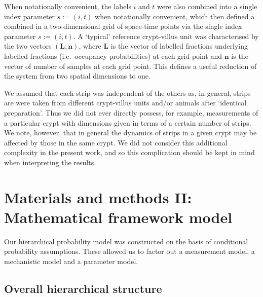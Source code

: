 \documentclass[10pt,letterpaper]{article}
\providecommand{\DIFaddtex}[1]{{\protect\color{blue} \sf #1}} %
\providecommand{\DIFdeltex}[1]{{\protect\color{red} \scriptsize #1}} %
\providecommand{\DIFaddbegin}{} %
\providecommand{\DIFaddend}{} %
\providecommand{\DIFdelbegin}{} %
\providecommand{\DIFdelend}{} %
\providecommand{\DIFadd}[1]{\texorpdfstring{\DIFaddtex{#1}}{#1}} %
\providecommand{\DIFdel}[1]{\texorpdfstring{\DIFdeltex{#1}}{}} %
\begin{document}
\DIFadd{When notationally convenient, the }\DIFaddend labels \(i\) and \(t\) were \DIFdelbegin \DIFdel{also combined
into a single index parameter \(s := (i,t)\) when notationally
convenient, which then defined a }\DIFdelend \DIFaddbegin \DIFadd{combined
in a }\DIFaddend two-dimensional grid of space-time points \DIFaddbegin \DIFadd{via the single index
parameter \(s := (i,t)\)}\DIFaddend . A `typical' reference crypt-villus unit was
characterised by the two vectors \((\mathbf{L},\mathbf{n})\), where
\(\mathbf{L}\) is the vector of \DIFdelbegin \DIFdel{labelled fractions }\DIFdelend \DIFaddbegin \DIFadd{underlying labelled fractions
(i.e.~occupancy probabilities) }\DIFaddend at each grid point and \(\mathbf{n}\) is
the vector of number of samples at each grid point. This defines a
useful reduction of the system from two spatial dimensions to one.

We assumed that each strip was independent of the others as, in general,
strips \DIFdelbegin \DIFdel{are }\DIFdelend \DIFaddbegin \DIFadd{were }\DIFaddend taken from different crypt-villus units and/or animals after
`identical preparation'. Thus we did not ever directly possess, for
example, measurements of a particular crypt with dimensions given in
terms of a certain number of strips. We note, however, that \DIFdelbegin \DIFdel{in general
}\DIFdelend the dynamics
of strips in a given crypt may be affected by those in the same crypt.
We did not consider this additional complexity in the present work, and
so this complication should be kept in mind when interpreting the
results.

\section{Materials and methods II: Mathematical
\DIFdelbegin \DIFdel{framework}\DIFdelend \DIFaddbegin \DIFadd{model}\DIFaddend }\DIFdelbegin %
\DIFdelend \DIFaddbegin \label{materials-and-methods-ii-mathematical-model}
\DIFaddend 

Our hierarchical probability model was constructed on the basis of
conditional probability assumptions. These allowed us to factor out a
measurement model, a mechanistic model and a parameter model.

\subsection{Overall hierarchical
structure}\label{overall-hierarchical-structure}
\end{document}
